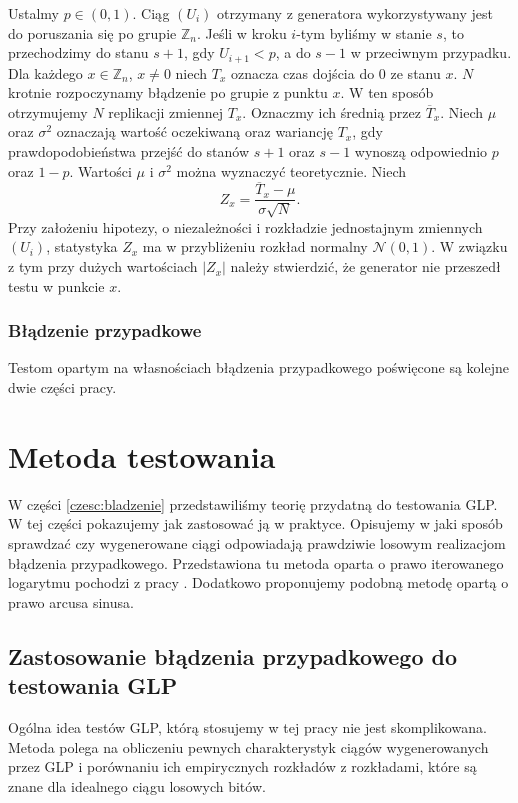 \documentclass[a4paper,11pt,twoside]{book}
\theoremstyle{definition}
\begin{document}
Ustalmy $p \in (0,1)$. Ciąg $(U_i)$ otrzymany z generatora wykorzystywany jest do poruszania się po grupie $\mathbb{Z}_n$. Jeśli w kroku $i$-tym byliśmy w stanie $s$, to przechodzimy do stanu $s+1$, gdy $U_{i+1} < p$, a do $s-1$ w przeciwnym przypadku. Dla każdego $x \in \mathbb{Z}_n$, $x \neq 0$ niech $T_x$ oznacza czas dojścia do $0$ ze stanu $x$. $N$ krotnie rozpoczynamy błądzenie po grupie z punktu $x$. W ten sposób otrzymujemy $N$ replikacji zmiennej $T_x$. Oznaczmy ich średnią przez $\overline{T}_x$. Niech $\mu$ oraz $\sigma^2$ oznaczają wartość oczekiwaną oraz wariancję $T_x$, gdy prawdopodobieństwa przejść do stanów $s+1$ oraz $s-1$ wynoszą odpowiednio $p$ oraz $1-p$. Wartości $\mu$ i $\sigma^2$ można wyznaczyć teoretycznie. Niech
\[ Z_x = \frac{\overline{T}_x - \mu}{\sigma \sqrt{N}}. \]
Przy założeniu hipotezy, o niezależności i rozkładzie jednostajnym zmiennych $(U_i)$, statystyka $Z_x$ ma w przybliżeniu rozkład normalny $\mathcal{N}(0,1)$. W związku z tym przy dużych wartościach $|Z_x|$ należy stwierdzić, że generator nie przeszedł testu w punkcie $x$. 

\subsection*{Błądzenie przypadkowe}
Testom opartym na własnościach błądzenia przypadkowego poświęcone są kolejne dwie części pracy.

\chapter{Metoda testowania}
\label{czesc:metoda}
W części \ref{czesc:bladzenie} przedstawiliśmy teorię przydatną do testowania GLP. W tej części pokazujemy jak zastosować ją w praktyce. Opisujemy w jaki sposób sprawdzać czy wygenerowane ciągi odpowiadają prawdziwie losowym realizacjom błądzenia przypadkowego. Przedstawiona tu metoda oparta o prawo iterowanego logarytmu pochodzi z pracy \cite{wang-nic}. Dodatkowo proponujemy podobną metodę opartą o prawo arcusa sinusa.



\section{Zastosowanie błądzenia przypadkowego do testowania GLP}

Ogólna idea testów GLP, którą stosujemy w tej pracy nie jest skomplikowana. Metoda polega na obliczeniu pewnych charakterystyk ciągów wygenerowanych przez GLP i porównaniu ich empirycznych rozkładów z rozkładami, które są znane dla idealnego ciągu losowych bitów.
\end{document}
